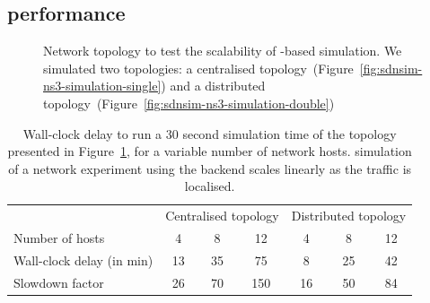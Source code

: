 \subsection{ performance} \label{sec:sdnsim-ns3-perf}

\begin{figure}[ht]
\caption[ scalability evaluation topology]{Network topology to test the
scalability of -based simulation. We simulated two topologies: a
centralised topology~(Figure~\ref{fig:sdnsim-ns3-simulation-single}) and a
distributed topology~(Figure~\ref{fig:sdnsim-ns3-simulation-double})}
\label{fig:sdnsim-ns3-simulation}
\end{figure}

\begin{table}
\begin{center}
\begin{tabular}{|l|c|c|c|c|c|c|} \hline
&\multicolumn{3}{|c|}{Centralised topology} & \multicolumn{3}{|c|}{Distributed
  topology} \\
\cline{2-7}
Number of hosts & 4 & 8 & 12 & 4 & 8 & 12 \\
\hline 
Wall-clock delay (in min) & 13 & 35 & 75 & 8 & 25 & 42 \\
\hline
Slowdown factor & 26 & 70 & 150 & 16 & 50 & 84 \\
\hline 
\end{tabular}
\end{center}
\caption[\sdnsim {} backend evaluation result]{Wall-clock delay to run a 30
    second simulation time of the topology presented in
    Figure~\ref{fig:sdnsim-ns3-simulation}, for a variable number of network
    hosts. \sdnsim simulation of a network experiment using the  backend
scales linearly as the traffic is localised. }
\label{tbl:sdnsim-ns3-simulation-results}
\end{table}

